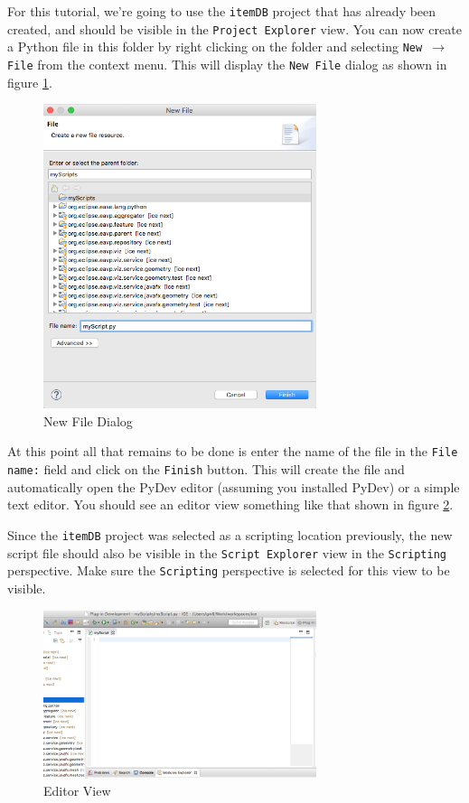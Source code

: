 For this tutorial, we're going to use the \texttt{itemDB} project that has
already been created, and should be visible in the \texttt{Project Explorer}
view. You can now create a Python file in this folder by right clicking on the
folder and selecting \texttt{New $\rightarrow$ File} from the context menu. 
This will display the \texttt{New File} dialog as shown in figure \ref{fig:newfile}.

\begin{figure}[!ht]
\centering
\includegraphics[width=8cm]{images/newfile}
\caption{New File Dialog}
\label{fig:newfile}
\end{figure}

At this point all that remains to be done is enter the name of the file in the
\texttt{File name:} field and click on the \texttt{Finish} button. This will
create the file and automatically open the PyDev editor (assuming you installed
PyDev) or a simple text editor. You should see an editor view something like
that shown in figure \ref{fig:editor}.

Since the \texttt{itemDB} project was selected as a scripting location
previously, the new script file should also be visible in the \texttt{Script
Explorer} view in the \texttt{Scripting} perspective. Make sure the
\texttt{Scripting} perspective is selected for this view to be visible.

\begin{figure}[!hb]
\centering
\includegraphics[width=8cm]{images/editor}
\caption{Editor View}
\label{fig:editor}
\end{figure}


